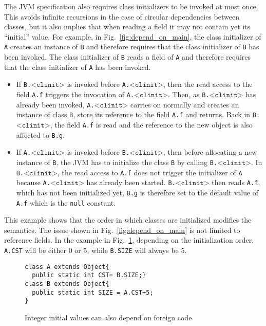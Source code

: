 \documentclass{entcs}
\newcommand{\clinit}{\ensuremath{\texttt{<clinit>}}}
\begin{document}
The JVM specification also requires class initializers to be invoked
at most once.
This avoids infinite recursions in the case of circular dependencies
between classes, but it also implies that when reading a field it may
not contain yet its ``initial'' value.  For example, in
Fig.~\ref{fig:depend_on_main}, the class initializer of \texttt{A}
creates an instance of \texttt{B} and therefore requires that the
class initializer of \texttt{B} has been invoked.  The class
initializer of \texttt{B} reads a field of \texttt{A} and therefore
requires that the class initializer of \texttt{A} has been invoked.
\begin{itemize}
\item If \texttt{B.\clinit} is invoked before \texttt{A.\clinit}, then
  the read access to the field \texttt{A.f} triggers the invocation of
  \texttt{A.\clinit}.  Then, as \texttt{B.\clinit} has already been
  invoked, \texttt{A.\clinit} carries on normally and creates an
  instance of class \texttt{B}, store its reference to the field
  \texttt{A.f} and returns.  Back in \texttt{B.\clinit}, the field
  \texttt{A.f} is read and the reference to the new object is also
  affected to \texttt{B.g}.
\item If \texttt{A.\clinit} is invoked before \texttt{B.\clinit}, then
  before allocating a new instance of \texttt{B}, the JVM has to
  initialize the class \texttt{B} by calling \texttt{B.\clinit}.  In
  \texttt{B.\clinit}, the read access to \texttt{A.f} does not trigger
  the initializer of \texttt{A} because \texttt{A.\clinit} has already
  been started.  \texttt{B.\clinit} then reads \texttt{A.f}, which has
  not been initialized yet, \texttt{B.g} is therefore set to the
  default value of \texttt{A.f} which is the \texttt{null} constant.
\end{itemize}
This example shows that the order in which classes are initialized
modifies the semantics.
The issue shown in Fig.~\ref{fig:depend_on_main} is not limited to
reference fields.  In the example in
Fig.~\ref{fig:integer_depend_on_main}, depending on the initialization
order, \texttt{A.CST} will be either 0 or 5, while \texttt{B.SIZE}
will always be 5.
\begin{figure}
  \centering
\begin{lstlisting}
class A extends Object{
  public static int CST= B.SIZE;}
class B extends Object{
  public static int SIZE = A.CST+5;
}
\end{lstlisting}
  \caption{Integer initial values can also depend on foreign code}
  \label{fig:integer_depend_on_main}
\end{figure}
\end{document}
